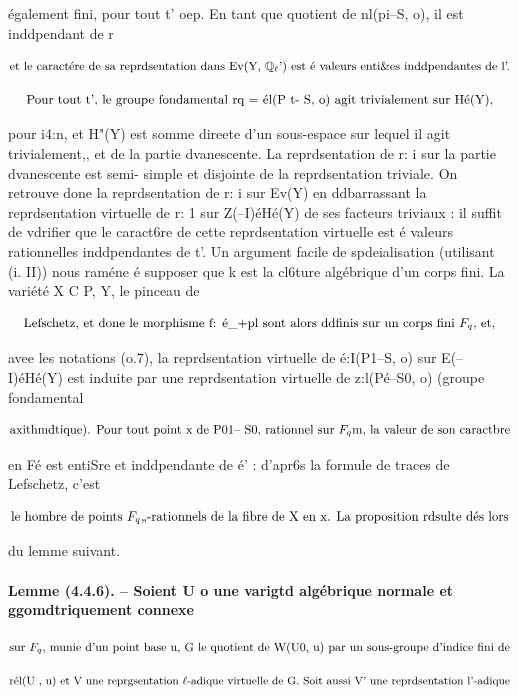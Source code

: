 \documentclass[11pt]{article}
\theoremstyle{remark}
\begin{document}
également fini, pour tout t' oep. En tant que quotient de nl(pi--S, o), il est inddpendant de r

\[\text{\small et le caractére de sa reprdsentation dans Ev(Y, \(\mathbb{Q}_{\ell}\)') est é valeurs enti\&es inddpendantes de l'.}\]

\[\text{\small Pour tout t', le groupe fondamental rq = él(P t- S, o) agit trivialement sur Hé(Y),}\]

pour i4:n, et H"(Y) est somme direete d'un sous-espace sur lequel il agit trivialement,, et de la partie dvanescente. La reprdsentation de r: i sur la partie dvanescente est semi- simple et disjointe de la reprdsentation triviale. On retrouve done la reprdsentation de r: i sur Ev(Y) en ddbarrassant la reprdsentation virtuelle de r: 1 sur Z(--I)éHé(Y) de ses facteurs triviaux : il suffit de vdrifier que le caract6re de cette reprdsentation virtuelle est é valeurs rationnelles inddpendantes de t'. Un argument facile de spdeialisation (utilisant (i. II)) nous raméne é supposer que k est la cl6ture algébrique d'un corps fini. La variété X C P, Y, le pinceau de

\[\text{\small Lefschetz, et done le morphisme f: é\_+pl sont alors ddfinis sur un corps fini \(F_q\), et,}\]

avee les notations (o.7), la reprdsentation virtuelle de é:I(P1--S, o) sur E(--I)éHé(Y) est induite par une reprdsentation virtuelle de z:l(Pé--S0, o) (groupe fondamental

\[\text{\small axithmdtique). Pour tout point x de P01-- S0, rationnel sur \(F_q\)m, la valeur de son caractbre}\]

en Fé est entiSre et inddpendante de é' : d'apr6s la formule de traces de Lefschetz, c'est

\[\text{\small le hombre de points \(F_q\),,-rationnels de la fibre de X en x. La proposition rdsulte dés lors}\]

du lemme suivant.

\paragraph{Lemme (4.4.6). -- Soient U o une varigtd algébrique normale et ggomdtriquement connexe}

\[\text{\small sur \(F_q\), munie d'un point base u, G le quotient de W(U0, u) par un sous-groupe d'indice fini de}\]

\[\text{\small rél(U , u) et V une reprgsentation \(\ell\)-adique virtuelle de G. Soit aussi V' une reprdsentation l'-adique}\]
\end{document}
